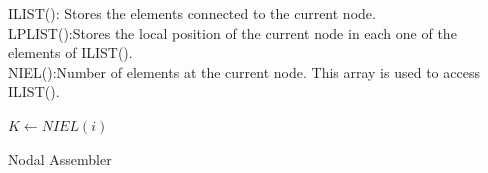 \noindent
ILIST(): Stores the elements connected to the current node.\\
LPLIST():Stores the local position of the current node in each one of the elements of ILIST().\\
NIEL():Number of elements at the current node. This array is used to access ILIST().\\


\begin{algorithm}[H]
\SetAlgoLined
{}
{
$K\leftarrow NIEL(i)$
}
\caption{Nodal Assembler}
\end{algorithm}






